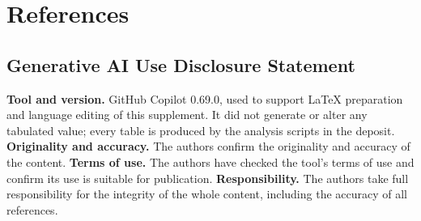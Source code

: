 \documentclass[fleqn,10pt]{wlpeerj}
\begin{document}
\section*{References}



\subsection*{Generative AI Use Disclosure Statement}
\noindent \textbf{Tool and version.} GitHub Copilot 0.69.0, used to support LaTeX preparation and language editing of this supplement. It did not generate or alter any tabulated value; every table is produced by the analysis scripts in the deposit. \textbf{Originality and accuracy.} The authors confirm the originality and accuracy of the content. \textbf{Terms of use.} The authors have checked the tool's terms of use and confirm its use is suitable for publication. \textbf{Responsibility.} The authors take full responsibility for the integrity of the whole content, including the accuracy of all references.
\end{document}
